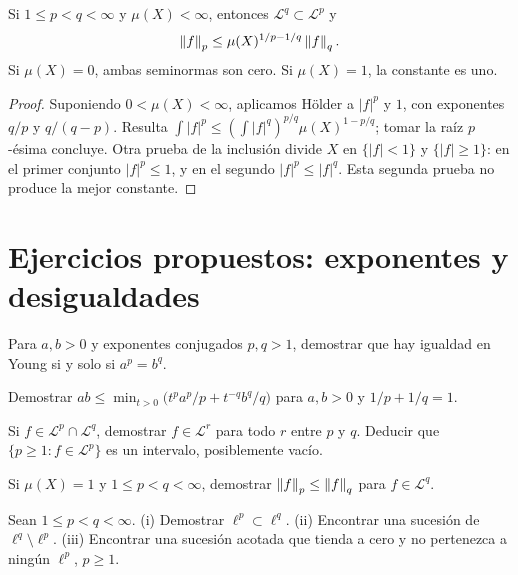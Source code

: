 \begin{proposicion}\label{v2:inclusion-finita}
Si $1\le p<q<\infty$ y $\mu(X)<\infty$, entonces $\mathcal L^q\subset\mathcal L^p$ y
\[
 \left\lVert f\right\rVert_p\le\mu(X)^{1/p-1/q}\left\lVert f\right\rVert_q.
\]
Si $\mu(X)=0$, ambas seminormas son cero. Si $\mu(X)=1$, la constante es uno.
\end{proposicion}
\begin{proof}
Suponiendo $0<\mu(X)<\infty$, aplicamos Hölder a $|f|^p$ y $1$, con exponentes $q/p$ y $q/(q-p)$. Resulta $\int|f|^p\le(\int|f|^q)^{p/q}\mu(X)^{1-p/q}$; tomar la raíz $p$-ésima concluye. Otra prueba de la inclusión divide $X$ en $\{|f|<1\}$ y $\{|f|\ge1\}$: en el primer conjunto $|f|^p\le1$, y en el segundo $|f|^p\le|f|^q$. Esta segunda prueba no produce la mejor constante.
\end{proof}

\section{Ejercicios propuestos: exponentes y desigualdades}
\begin{ejercicio}\label{ej:v2-l18-1}
Para $a,b>0$ y exponentes conjugados $p,q>1$, demostrar que hay igualdad en Young si y solo si $a^p=b^q$.
\end{ejercicio}

\begin{ejercicio}\label{ej:v2-l18-2}
Demostrar $ab\le\min_{t>0}\bigl(t^pa^p/p+t^{-q}b^q/q\bigr)$ para $a,b>0$ y $1/p+1/q=1$.
\end{ejercicio}

\begin{ejercicio}\label{ej:v2-l18-3}
Si $f\in\mathcal L^p\cap\mathcal L^q$, demostrar $f\in\mathcal L^r$ para todo $r$ entre $p$ y $q$. Deducir que $\{p\ge1:f\in\mathcal L^p\}$ es un intervalo, posiblemente vacío.
\end{ejercicio}

\begin{ejercicio}\label{ej:v2-l18-4}
Si $\mu(X)=1$ y $1\le p<q<\infty$, demostrar $\left\lVert f\right\rVert_p\le\left\lVert f\right\rVert_q$ para $f\in\mathcal L^q$.
\end{ejercicio}

\begin{ejercicio}\label{ej:v2-l18-5}
Sean $1\le p<q<\infty$. (i) Demostrar $\ell^p\subset\ell^q$. (ii) Encontrar una sucesión de $\ell^q\setminus\ell^p$. (iii) Encontrar una sucesión acotada que tienda a cero y no pertenezca a ningún $\ell^p$, $p\ge1$.
\end{ejercicio}

